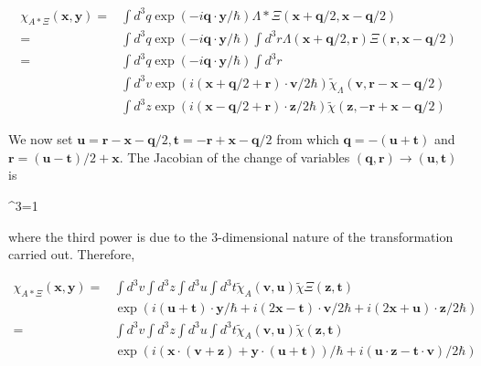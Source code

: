 \documentclass{article}
\begin{document}
\begin{align*}
\chi_{A * \Xi}(\boldsymbol{x}, \boldsymbol{y})= & \int d^{3} q \exp (-i \boldsymbol{q} \cdot \boldsymbol{y} / \hbar) \Lambda * \Xi(\boldsymbol{x}+\boldsymbol{q} / 2, \boldsymbol{x}-\boldsymbol{q} / 2)  \tag{3.7.39}\\
= & \int d^{3} q \exp (-i \boldsymbol{q} \cdot \boldsymbol{y} / \hbar) \int d^{3} r \Lambda(\boldsymbol{x}+\boldsymbol{q} / 2, \boldsymbol{r}) \Xi(\boldsymbol{r}, \boldsymbol{x}-\boldsymbol{q} / 2) \\
= & \int d^{3} q \exp (-i \boldsymbol{q} \cdot \boldsymbol{y} / \hbar) \int d^{3} r \\
& \int d^{3} v \exp (i(\boldsymbol{x}+\boldsymbol{q} / 2+\boldsymbol{r}) \cdot \boldsymbol{v} / 2 \hbar) \tilde{\chi}_{\Lambda}(\boldsymbol{v}, \boldsymbol{r}-\boldsymbol{x}-\boldsymbol{q} / 2) \\
& \int d^{3} z \exp (i(\boldsymbol{x}-\boldsymbol{q} / 2+\boldsymbol{r}) \cdot \boldsymbol{z} / 2 \hbar) \tilde{\chi}(\boldsymbol{z},-\boldsymbol{r}+\boldsymbol{x}-\boldsymbol{q} / 2)
\end{align*}
 

We now set $\boldsymbol{u}=\boldsymbol{r}-\boldsymbol{x}-\boldsymbol{q} / 2, \boldsymbol{t}=-\boldsymbol{r}+\boldsymbol{x}-\boldsymbol{q} / 2$ from which $\boldsymbol{q}=-(\boldsymbol{u}+\boldsymbol{t})$ and $\boldsymbol{r}=(\boldsymbol{u}-\boldsymbol{t}) / 2+\boldsymbol{x}$. The Jacobian of the change of variables $(\boldsymbol{q}, \boldsymbol{r}) \rightarrow(\boldsymbol{u}, \boldsymbol{t})$ is
 
^{3}=1
 
where the third power is due to the 3-dimensional nature of the transformation carried out. Therefore,
 
\begin{align*}
\chi_{A * \Xi}(\boldsymbol{x}, \boldsymbol{y})= & \int d^{3} v \int d^{3} z \int d^{3} u \int d^{3} t \tilde{\chi}_{A}(\boldsymbol{v}, \boldsymbol{u}) \tilde{\chi} \Xi(\boldsymbol{z}, \boldsymbol{t})  \tag{3.7.40}\\
& \exp (i(\boldsymbol{u}+\boldsymbol{t}) \cdot \boldsymbol{y} / \hbar+i(2 \boldsymbol{x}-\boldsymbol{t}) \cdot \boldsymbol{v} / 2 \hbar+i(2 \boldsymbol{x}+\boldsymbol{u}) \cdot \boldsymbol{z} / 2 \hbar) \\
= & \int d^{3} v \int d^{3} z \int d^{3} u \int d^{3} t \tilde{\chi}_{A}(\boldsymbol{v}, \boldsymbol{u}) \tilde{\chi}(\boldsymbol{z}, \boldsymbol{t}) \\
& \exp (i(\boldsymbol{x} \cdot(\boldsymbol{v}+\boldsymbol{z})+\boldsymbol{y} \cdot(\boldsymbol{u}+\boldsymbol{t})) / \hbar+i(\boldsymbol{u} \cdot \boldsymbol{z}-\boldsymbol{t} \cdot \boldsymbol{v}) / 2 \hbar)
\end{align*}
 
\end{document}
